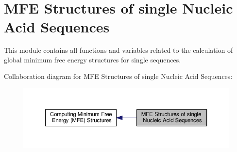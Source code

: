 \hypertarget{group__mfe__fold__single}{\section{M\-F\-E Structures of single Nucleic Acid Sequences}
\label{group__mfe__fold__single}
}


This module contains all functions and variables related to the calculation of global minimum free energy structures for single sequences.  


Collaboration diagram for M\-F\-E Structures of single Nucleic Acid Sequences\-:
\nopagebreak
\begin{figure}[H]
\begin{center}
\leavevmode
\includegraphics[width=350pt]{group__mfe__fold__single}
\end{center}
\end{figure}
